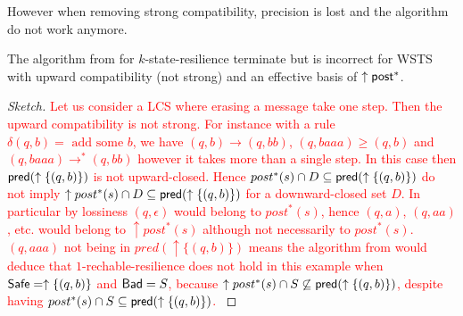 However when removing strong compatibility, precision is lost and the algorithm do not work anymore.

\begin{proposition}
The algorithm from \cite{DBLP:conf/gg/Ozkan22} for {\sc $k$-state-resilience} terminate but is incorrect for WSTS with upward compatibility (not strong) and an effective basis of $\uparrow \textsf{post}^*$.
\end{proposition}

\begin{proof}[Sketch]
\textcolor{red}{
Let us consider a LCS where erasing a message take one step. Then the upward compatibility is not strong. 
For instance with a rule $\delta(q,b) = \text{ add some }b $,
we have $(q,b) \to (q,bb)$, $(q, baaa) \geq (q,b)$ and
$(q, baaa) \to^* (q,bb)$ however it takes more than a single step. 
In this case then $\textsf{pred}(\uparrow \{(q,b)\})$ is not upward-closed. Hence 
$post^* (s) \cap D \subseteq \textsf{pred}(\uparrow \{(q,b)\})$
do not imply
$\uparrow post^* (s) \cap D \subseteq \textsf{pred}(\uparrow \{(q,b)\})$ for a downward-closed set $D$.
In particular by lossiness $(q, \epsilon)$ would belong to
$post^* (s)$,
hence $(q,a)$, $(q,aa)$, etc. would belong to $\uparrow post^* (s)$ although not necessarily to
$post^* (s)$. $(q,aaa)$ not being in $pred(\uparrow \{ (q,b)\})$ means the algorithm 
from \cite{DBLP:conf/gg/Ozkan22} would deduce that $1$-rechable-resilience does not hold in this example when $\textsf{Safe}=\uparrow \{(q,b)\}$ and $\textsf{Bad} =S$,
because $\uparrow post^* (s) \cap S \not\subseteq \textsf{pred}(\uparrow \{(q,b)\})$,
despite having 
$post^* (s) \cap S \subseteq \textsf{pred}(\uparrow \{(q,b)\})$.
}

\iffalse
{}
\end{proof}
